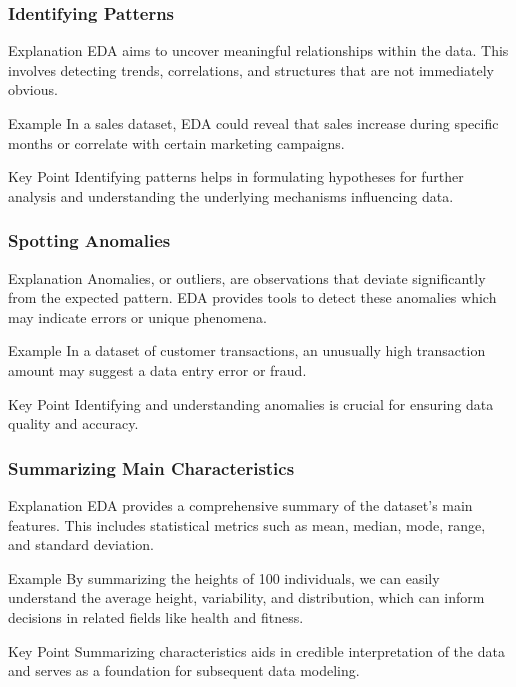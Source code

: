 \documentclass{beamer}
\begin{document}
\begin{frame}[fragile]
    \frametitle{Identifying Patterns}
    \begin{block}{Explanation}
        EDA aims to uncover meaningful relationships within the data. This involves detecting trends, correlations, and structures that are not immediately obvious.
    \end{block}
    
    \begin{block}{Example}
        In a sales dataset, EDA could reveal that sales increase during specific months or correlate with certain marketing campaigns.
    \end{block}
    
    \begin{block}{Key Point}
        Identifying patterns helps in formulating hypotheses for further analysis and understanding the underlying mechanisms influencing data.
    \end{block}
\end{frame}

\begin{frame}[fragile]
    \frametitle{Spotting Anomalies}
    \begin{block}{Explanation}
        Anomalies, or outliers, are observations that deviate significantly from the expected pattern. EDA provides tools to detect these anomalies which may indicate errors or unique phenomena.
    \end{block}
    
    \begin{block}{Example}
        In a dataset of customer transactions, an unusually high transaction amount may suggest a data entry error or fraud.
    \end{block}
    
    \begin{block}{Key Point}
        Identifying and understanding anomalies is crucial for ensuring data quality and accuracy.
    \end{block}
\end{frame}

\begin{frame}[fragile]
    \frametitle{Summarizing Main Characteristics}
    \begin{block}{Explanation}
        EDA provides a comprehensive summary of the dataset's main features. This includes statistical metrics such as mean, median, mode, range, and standard deviation.
    \end{block}
    
    \begin{block}{Example}
        By summarizing the heights of 100 individuals, we can easily understand the average height, variability, and distribution, which can inform decisions in related fields like health and fitness.
    \end{block}
    
    \begin{block}{Key Point}
        Summarizing characteristics aids in credible interpretation of the data and serves as a foundation for subsequent data modeling.
    \end{block}
\end{frame}
\end{document}
